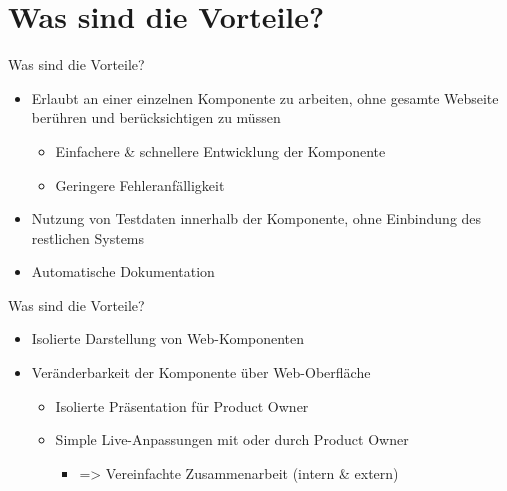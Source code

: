 \documentclass{beamer}
\begin{document}

\section{Was sind die Vorteile?} %

\begin{frame}{Was sind die Vorteile?}
	\begin{itemize}
		\item Erlaubt an einer einzelnen Komponente zu arbeiten, ohne gesamte Webseite berühren und berücksichtigen zu müssen
		\begin{itemize}
			\item Einfachere \& schnellere Entwicklung der Komponente
			\item Geringere Fehleranfälligkeit
		\end{itemize}
		\item Nutzung von Testdaten innerhalb der Komponente, ohne Einbindung des restlichen Systems
		\item Automatische Dokumentation
	\end{itemize}
\end{frame}

\begin{frame}{Was sind die Vorteile?}
	\begin{itemize}
		\item Isolierte Darstellung von Web-Komponenten
		\item Veränderbarkeit der Komponente über Web-Oberfläche
		\begin{itemize}
			\item Isolierte Präsentation für Product Owner
			\item Simple Live-Anpassungen mit oder durch Product Owner
			\begin{itemize}
				\item => Vereinfachte Zusammenarbeit (intern \& extern)
			\end{itemize}
		\end{itemize}
	\end{itemize}
\end{frame}
\end{document}
